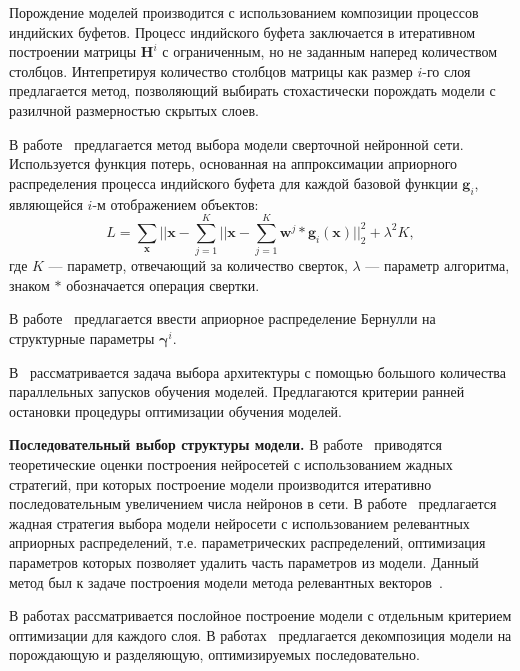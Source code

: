 Порождение моделей производится с использованием композиции процессов индийских буфетов. Процесс индийского буфета заключается в итеративном построении матрицы $\mathbf{H}^i$ с ограниченным, но не заданным наперед количеством столбцов. Интепретируя количество столбцов  матрицы как размер $i$-го слоя предлагается метод, позволяющий выбирать стохастически порождать модели с разилчной размерностью скрытых слоев. 

В работе~\cite{cib_simple} предлагается метод выбора модели сверточной нейронной сети. Используется функция потерь, основанная на аппроксимации априорного распределения процесса индийского буфета для каждой базовой функции $\mathbf{g}_i$, являющейся $i$-м отображением объектов:
\[
    L = \sum_{\mathbf{x}}||\mathbf{x} - \sum_{j=1}^K ||\mathbf{x} - \sum_{j=1}^K \mathbf{w}^j * \mathbf{g}_i(\mathbf{x})||_2^2 + \lambda^2K,
\]
где $K$ --- параметр, отвечающий за количество сверток, $\lambda$ --- параметр алгоритма, знаком $*$ обозначается операция свертки.

В работе~\cite{shirakawa2018dynamic} предлагается ввести априорное распределение Бернулли на структурные параметры $\boldsymbol{\gamma}^i$.

В~\cite{optimal_racing} рассматривается задача выбора архитектуры с помощью большого количества параллельных запусков обучения моделей. Предлагаются критерии ранней остановки процедуры оптимизации обучения моделей.

\par{\textbf{Последовательный выбор структуры модели. }}
В работе~\cite{greed} приводятся теоретические оценки построения нейросетей с использованием жадных стратегий,  при которых построение модели производится итеративно последовательным увеличением числа нейронов в сети. В работе~\cite{greed_mlp} предлагается жадная стратегия выбора модели нейросети с использованием релевантных априорных распределений, т.е. параметрических распределений, оптимизация параметров которых позволяет удалить часть параметров из модели. Данный метод был к задаче построения модели метода релевантных векторов~\cite{rvm}. 

В работах\cite{Bengio, hd} рассматривается послойное построение модели с отдельным критерием оптимизации для каждого слоя. В работах~\cite{Kingma, gendis_pictures, gendis_phd} предлагается декомпозиция модели на порождающую и разделяющую, оптимизируемых последовательно. 


